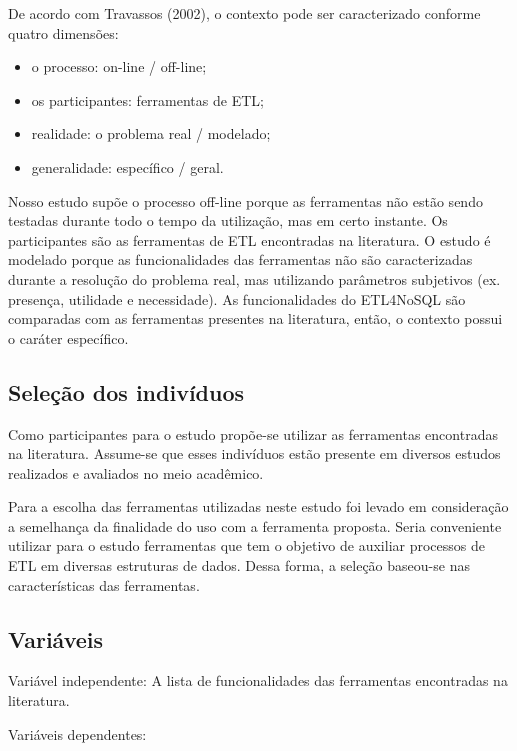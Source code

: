 De acordo com Travassos (2002), o contexto pode ser caracterizado conforme quatro dimensões:

\begin{itemize}
	\item o processo: on-line / off-line;
	\item os participantes: ferramentas de ETL;
	\item realidade: o problema real / modelado;
	\item generalidade: específico / geral.
\end{itemize}

Nosso estudo supõe o processo off-line porque as ferramentas não estão sendo testadas durante todo o tempo da utilização, mas em certo instante. Os participantes são as ferramentas de ETL encontradas na literatura. O estudo é modelado porque as funcionalidades das ferramentas não são caracterizadas durante a resolução do problema real, mas utilizando parâmetros subjetivos (ex. presença, utilidade e necessidade). As funcionalidades do ETL4NoSQL são comparadas com as ferramentas presentes na literatura, então, o contexto possui o caráter específico.

\subsection{Seleção dos indivíduos}

Como participantes para o estudo propõe-se utilizar as ferramentas encontradas na literatura. Assume-se que esses indivíduos estão presente em diversos estudos realizados e avaliados no meio acadêmico.

Para a escolha das ferramentas utilizadas neste estudo foi levado em consideração a semelhança da finalidade do uso com a ferramenta proposta. Seria conveniente utilizar para o estudo ferramentas que tem o objetivo de auxiliar processos de ETL em diversas estruturas de dados. Dessa forma, a seleção baseou-se nas características das ferramentas.

\subsection{Variáveis}


Variável independente: A lista de funcionalidades das ferramentas encontradas na literatura.

Variáveis dependentes: 

